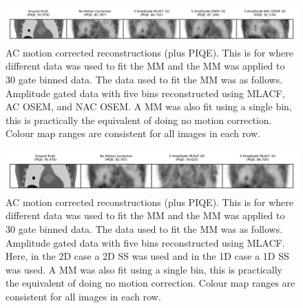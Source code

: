             \begin{figure}
                \centering
                
                \includegraphics[width=1.0\linewidth]{figures/motion_correction_2_results_2_5_amplitude_visual_analysis.png}
                
                \captionsetup{singlelinecheck=false}
                \caption{
                    \gls{AC} motion corrected reconstructions (plus \gls{PIQE}). This is for where different data was used to fit the \gls{MM} and the \gls{MM} was applied to $30$ gate binned data. The data used to fit the \gls{MM} was as follows. Amplitude gated data with five bins reconstructed using \gls{MLACF}, \gls{AC} \gls{OSEM}, and \gls{NAC} \gls{OSEM}. A \gls{MM} was also fit using a single bin, this is practically the equivalent of doing no motion correction. Colour map ranges are consistent for all images in each row.
                }
                
                \label{fig:evaluation_of_pet_ct_motion_correction_incorporating_motion_models_using_mlacf_and_complex_gating_schemes_results_5_amplitude_visual_analysis}
            \end{figure}

            \begin{figure}
                \centering
                
                \includegraphics[width=1.0\linewidth]{figures/motion_correction_2_results_2_1d_vs_2d_visual_analysis.png}
                
                \captionsetup{singlelinecheck=false}
                \caption{
                    \gls{AC} motion corrected reconstructions (plus \gls{PIQE}). This is for where different data was used to fit the \gls{MM} and the \gls{MM} was applied to $30$ gate binned data. The data used to fit the \gls{MM} was as follows. Amplitude gated data with five bins reconstructed using \gls{MLACF}. Here, in the \gls{2D} case a \gls{2D} \gls{SS} was used and in the \gls{1D} case a \gls{1D} \gls{SS} was used. A \gls{MM} was also fit using a single bin, this is practically the equivalent of doing no motion correction. Colour map ranges are consistent for all images in each row.
                }
                
                \label{fig:evaluation_of_pet_ct_motion_correction_incorporating_motion_models_using_mlacf_and_complex_gating_schemes_results_1d_vs_2d_visual_analysis}
            \end{figure}

